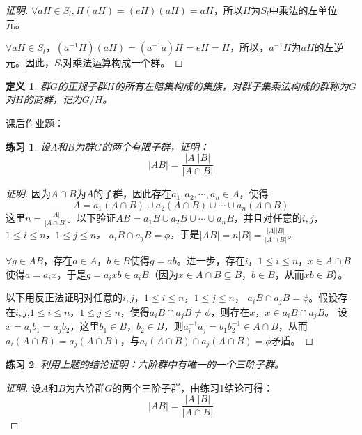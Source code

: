 \documentclass{article}
\newtheorem{Def}{定义}
\newtheorem{Exercise}{练习}
\begin{document}
\begin{CJK*}{UTF8}{gbsn}
\begin{proof}[证明]
    $\forall aH\in S_l,H(aH)=(eH)(aH)=aH$，所以$H$为$S_l$中乘法的左单位元。
  
    $\forall aH\in S_l$，$(a^{-1}H)(aH)=(a^{-1}a)H=eH=H$，所以，$a^{-1}H$为$aH$的左逆元。因此，$S_l$对乘法运算构成一个群。
  \end{proof}
  \begin{Def}
    群$G$的正规子群$H$的所有左陪集构成的集族，对群子集乘法构成的群称为$G$对$H$的商群，记为$G/H$。
  \end{Def}  

\clearpage

课后作业题：
\begin{Exercise}
设$A$和$B$为群$G$的两个有限子群，证明：
\[|AB|=\frac{|A||B|}{|A\cap B|}\]
\end{Exercise}
\begin{proof}[证明]
  因为$A\cap B$为$A$的子群，因此存在$a_1,a_2,\cdots,a_n\in A$，使得
  \[A=a_1(A\cap B)\cup a_2(A\cap B)\cup \cdots \cup a_n(A\cap B)\]
  这里$n=\frac{|A|}{|A\cap B|}$。以下验证$AB=a_1B\cup a_2B\cup \cdots \cup a_nB$，并且对任意的$i,j$，$1\leq i \leq n$，$1\leq j \leq n$，
  $a_iB\cap a_jB=\phi$，于是$|AB|=n|B|=\frac{|A||B|}{|A\cap B|}$。

  $\forall g\in AB$，存在$a\in A$，$b\in B$使得$g=ab$。进一步，存在$i$，$1\leq i\leq n$，$x\in A\cap B$使得$a=a_ix$，于是$g=a_ixb\in a_iB$（因为$x\in A\cap B\subseteq B$，$b\in B$，从而$xb\in B$）。

以下用反正法证明对任意的$i,j$，$1\leq i \leq n$，$1\leq j \leq n$，
$a_iB\cap a_jB=\phi$。假设存在$i,j$,$1\leq i \leq n$，$1\leq j \leq n$，使得$a_iB\cap a_jB\neq \phi$，则存在$x$，$x\in a_iB\cap a_jB$。
设$x=a_ib_1=a_jb_2$，这里$b_1\in B$，$b_2\in B$，则$a_i^{-1}a_j=b_1b_2^{-1}\in A\cap B$，从而$a_i(A\cap B)=a_j(A\cap B)$，与$a_i(A\cap B)\cap a_j(A\cap B)=\phi$矛盾。

\end{proof}
\begin{Exercise}
  利用上题的结论证明：六阶群中有唯一的一个三阶子群。
\end{Exercise}
\begin{proof}[证明]
  设$A$和$B$为六阶群$G$的两个三阶子群，由练习1结论可得：
  \[|AB|=\frac{|A||B|}{|A\cap B|}\]


\end{proof}
\end{CJK*}
\end{document}
